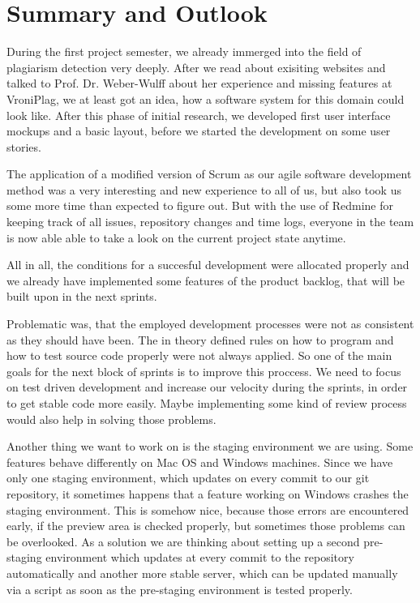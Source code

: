 \chapter{Summary and Outlook}\label{chap:summaryAndOutlook}

During the first project semester, we already immerged into the field of plagiarism detection very deeply. After
we read about exisiting websites and talked to Prof. Dr. Weber-Wulff about her experience and missing features
at VroniPlag, we at least got an idea, how a software system for this domain could look like. After this phase of 
initial research, we 
developed first 
user interface mockups and
a basic layout, before we started the development on some user stories. 

The application of a modified version of Scrum as our agile software development method was a very interesting and new
experience to all of us, but also took us some more time than expected to figure out. But with the use of Redmine for 
keeping track of all 
issues, repository changes and time logs, 
everyone in the team is now able able to take a look on the current project state anytime.

All in all, the conditions for a succesful development were allocated properly and we already have implemented some 
features of the product backlog, that will be built upon in the next sprints.

Problematic was, that the employed development processes were not as consistent as they should have been. The in 
theory defined rules on how to program and how to test source code properly were not always applied. So one of the 
main goals for the next block of sprints is to improve this proccess. We need to focus on test driven development and 
increase our velocity during the sprints, in order to get stable code more easily. Maybe implementing some kind of 
review process would also help in solving those problems.

Another thing we want to work on is the staging environment we are using. Some features behave differently on Mac 
OS and Windows machines. Since we have only one staging environment, which updates on every commit to our git 
repository, it sometimes happens that a feature working on Windows crashes the staging environment. This is somehow 
nice, because those errors are encountered early, if the preview area is checked properly, but sometimes those problems
can be overlooked. As a solution 
we are thinking about setting up a second pre-staging environment which updates at every commit to the repository 
automatically and 
another more stable server, which can be updated manually via a script as soon as the pre-staging environment is tested properly. 

